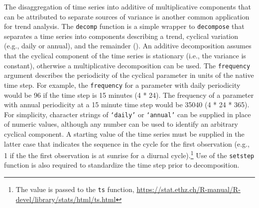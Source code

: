 \documentclass[10pt,letterpaper]{article}\usepackage[]{graphicx}\usepackage[]{color}
\begin{document}
The disaggregation of time series into additive of multiplicative components that can be attributed to separate sources of variance is another common application for trend analysis.  The \texttt{decomp} function is a simple wrapper to \texttt{decompose} \cite{Kendall83} that separates a time series into components describing a trend, cyclical variation (e.g., daily or annual), and the remainder  ().  An additive decomposition assumes that the cyclical component of the time series is stationary (i.e., the variance is constant), otherwise a multiplicative decomposition can be used.  The \texttt{frequency} argument describes the periodicity of the cyclical parameter in units of the native time step.  For example, the \texttt{frequency} for a parameter with daily periodicity would be 96 if the time step is 15 minutes (4 * 24).  The frequency of a parameter with annual periodicity at a 15 minute time step would be 35040 (4 * 24 * 365).  For simplicity, character strings of \texttt{`daily'} or \texttt{`annual'} can be supplied in place of numeric values, although any number can be used to identify an arbitrary cyclical component.  A starting value of the time series must be supplied in the latter case that indicates the sequence in the cycle for the first observation (e.g., 1 if the the first observation is at sunrise for a diurnal cycle).\footnote{The value is passed to the \texttt{ts} function, \url{https://stat.ethz.ch/R-manual/R-devel/library/stats/html/ts.html}}  Use of the \texttt{setstep} function is also required to standardize the time step prior to decomposition.
\end{document}
